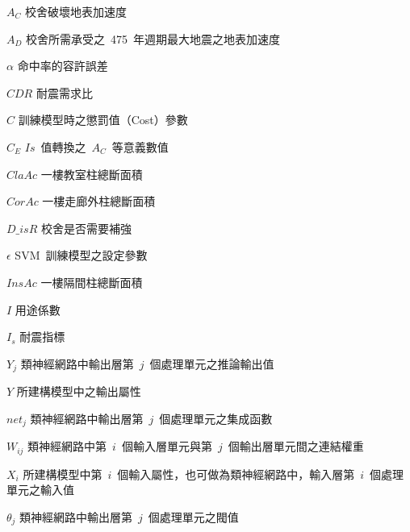 %
\begin{SymEntry}

\item[$A_C$]
校舍破壞地表加速度

\item[$A_D$]
校舍所需承受之~475~年週期最大地震之地表加速度

\item[$\alpha$]
命中率的容許誤差

\item[$CDR$]
耐震需求比

\item[$C$]
訓練模型時之懲罰值（Cost）參數

\item[$C_E$]
$Is$~值轉換之~$A_C$~等意義數值

\item[$ClaAc$]
一樓教室柱總斷面積

\item[$CorAc$]
一樓走廊外柱總斷面積

\item[$D\_isR$]
校舍是否需要補強

\item[$\epsilon$]
SVM~訓練模型之設定參數

\item[$InsAc$]
一樓隔間柱總斷面積

\item[$I$]
用途係數

\item[$I_s$]
耐震指標

\item[$Y_j$]
類神經網路中輸出層第~$j$~個處理單元之推論輸出值

\item[$Y$]
所建構模型中之輸出屬性

\item[$net_j$]
類神經網路中輸出層第~$j$~個處理單元之集成函數

\item[$W_{ij}$]
類神經網路中第~$i$~個輸入層單元與第~$j$~個輸出層單元間之連結權重

\item[$X_i$]
所建構模型中第~$i$~個輸入屬性，也可做為類神經網路中，輸入層第~$i$~個處理單元之輸入值

\item[$\theta_j$]
類神經網路中輸出層第~$j$~個處理單元之閥值


\end{SymEntry}
